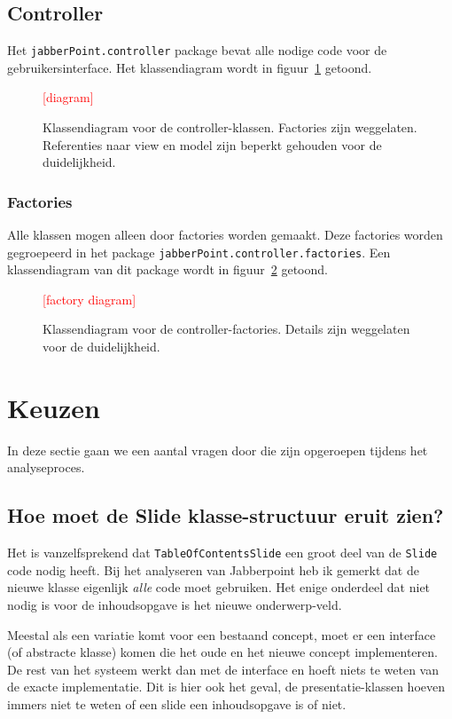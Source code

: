 \documentclass[a4paper]{article}
\newcommand{\todo}[1]{\textcolor{red}{[#1]}\\}
\newcommand{\question}[1]{
  \subsection{#1}
}
\newcommand{\code}[1]{\lstinline[columns=fixed]{#1}}
\begin{document}
	\subsection{Controller}
		Het \code{jabberPoint.controller} package bevat alle nodige code voor de gebruikersinterface.
		Het klassendiagram wordt in figuur~\ref{diagram:controller} getoond.

		\begin{figure}[!htb]
		 \caption{
			Klassendiagram voor de controller-klassen.\label{diagram:controller}
			Factories zijn weggelaten.
			Referenties naar view en model zijn beperkt gehouden voor de duidelijkheid.
		 }
		 \todo{diagram} %
		\end{figure}

		\subsubsection{Factories}
			Alle klassen mogen alleen door factories worden gemaakt.
			Deze factories worden gegroepeerd in het package \code{jabberPoint.controller.factories}.
			Een klassendiagram van dit package wordt in figuur~\ref{diagram:controller-factories} getoond.

			\begin{figure}[!htb]
			 \caption{
				Klassendiagram voor de controller-factories.\label{diagram:controller-factories}
				Details zijn weggelaten voor de duide\-lijk\-heid.
			 }
			 \todo{factory diagram} %
			\end{figure}


\section{Keuzen}\label{sec:keuzen}
    In deze sectie gaan we een aantal vragen door die zijn opgeroepen tijdens het analyseproces.
    
    \question{Hoe moet de Slide klasse-structuur eruit zien?}
    Het is vanzelfsprekend dat \code{TableOfContentsSlide} een groot deel van de \code{Slide} code nodig heeft.
    Bij het analyseren van Jabberpoint heb ik gemerkt dat de nieuwe klasse eigenlijk \textit{alle} code moet gebruiken.
    Het enige onderdeel dat niet nodig is voor de inhoudsopgave is het nieuwe onderwerp-veld.
    
    Meestal als een variatie komt voor een bestaand concept, moet er een interface (of abstracte klasse) komen die het oude en het nieuwe concept implementeren.
    De rest van het systeem werkt dan met de interface en hoeft niets te weten van de exacte implementatie.
    Dit is hier ook het geval, de presentatie-klassen hoeven immers niet te weten of een slide een inhoudsopgave is of niet.
    
\end{document}
